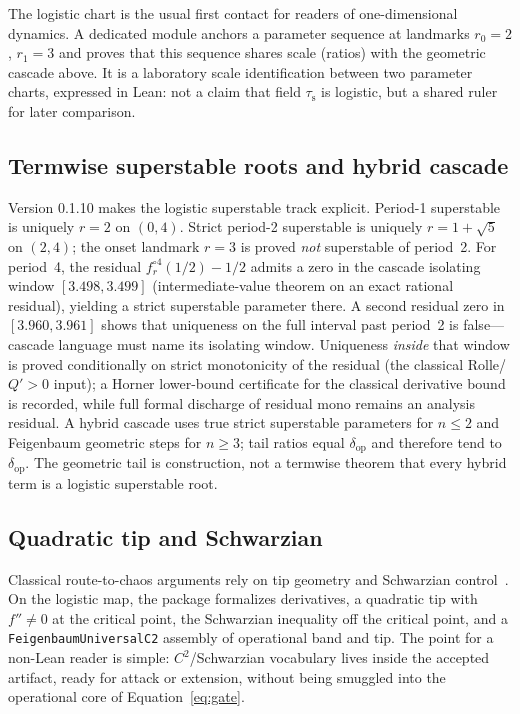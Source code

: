 \documentclass[11pt,a4paper]{article}
\newcommand{\taus}{\tau_{\mathrm{s}}}
\newcommand{\deltaop}{\delta_{\mathrm{op}}}
\begin{document}
The logistic chart is the usual first contact for readers of one-dimensional dynamics.
A dedicated module anchors a parameter sequence at landmarks \(r_0=2\), \(r_1=3\) and proves that this sequence shares scale (ratios) with the geometric cascade above.
It is a laboratory scale identification between two parameter charts, expressed in Lean: not a claim that field \(\taus\) is logistic, but a shared ruler for later comparison.

\subsection{Termwise superstable roots and hybrid cascade}

Version 0.1.10 makes the logistic superstable track explicit.
Period-1 superstable is uniquely \(r=2\) on \((0,4)\).
Strict period-2 superstable is uniquely \(r=1+\sqrt5\) on \((2,4)\); the onset landmark \(r=3\) is proved \emph{not} superstable of period~2.
For period~4, the residual \(f_r^{\circ 4}(1/2)-1/2\) admits a zero in the cascade isolating window \([3.498,3.499]\) (intermediate-value theorem on an exact rational residual), yielding a strict superstable parameter there.
A second residual zero in \([3.960,3.961]\) shows that uniqueness on the full interval past period~2 is false---cascade language must name its isolating window.
Uniqueness \emph{inside} that window is proved conditionally on strict monotonicity of the residual (the classical Rolle/\(Q'>0\) input); a Horner lower-bound certificate for the classical derivative bound is recorded, while full formal discharge of residual mono remains an analysis residual.
A hybrid cascade uses true strict superstable parameters for \(n\le 2\) and Feigenbaum geometric steps for \(n\ge 3\); tail ratios equal \(\deltaop\) and therefore tend to \(\deltaop\).
The geometric tail is construction, not a termwise theorem that every hybrid term is a logistic superstable root.

\subsection{Quadratic tip and Schwarzian}

Classical route-to-chaos arguments rely on tip geometry and Schwarzian control~\cite{singer1978}.
On the logistic map, the package formalizes derivatives, a quadratic tip with \(f''\ne 0\) at the critical point, the Schwarzian inequality off the critical point, and a \texttt{FeigenbaumUniversalC2} assembly of operational band and tip.
The point for a non-Lean reader is simple: \(C^2\)/Schwarzian vocabulary lives inside the accepted artifact, ready for attack or extension, without being smuggled into the operational core of Equation~\eqref{eq:gate}.
\end{document}
